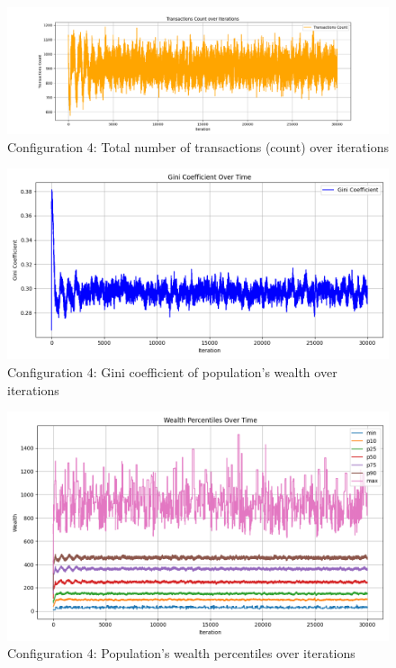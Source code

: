 \documentclass[english]{projectreport}
\begin{document}
    \begin{figure}[H]
        \centering
        \includegraphics[width=0.8\linewidth]{metrics_config4/metrics_config4_total_transactions_count.png}
        \caption{Configuration 4: Total number of transactions (count) over iterations}
        \label{fig:c0-total_transactions_count}
    \end{figure}

    \begin{figure}[H]
        \centering
        \includegraphics[width=0.8\linewidth]{metrics_config4/metrics_config4_gini_coefficient.png}
        \caption{Configuration 4: Gini coefficient of population's wealth over iterations}
        \label{fig:c0-gini_coefficient}
    \end{figure}

    \begin{figure}[H]
        \centering
        \includegraphics[width=0.8\linewidth]{metrics_config4/metrics_config4_wealth_perc_time.png}
        \caption{Configuration 4: Population's wealth percentiles over iterations}
        \label{fig:c0-wealth_perc_time}
    \end{figure}
\end{document}
